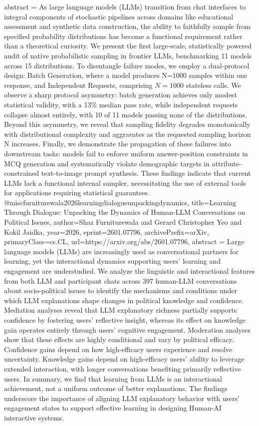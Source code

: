 {      abstract = {As large language models (LLMs) transition from chat interfaces to integral components of stochastic pipelines across domains like educational assessment and synthetic data construction, the ability to faithfully sample from specified probability distributions has become a functional requirement rather than a theoretical curiosity. We present the first large-scale, statistically powered audit of native probabilistic sampling in frontier LLMs, benchmarking 11 models across 15 distributions. To disentangle failure modes, we employ a dual-protocol design: Batch Generation, where a model produces N=1000 samples within one response, and Independent Requests, comprising $N=1000$ stateless calls. We observe a sharp protocol asymmetry: batch generation achieves only modest statistical validity, with a 13\% median pass rate, while independent requests collapse almost entirely, with 10 of 11 models passing none of the distributions. Beyond this asymmetry, we reveal that sampling fidelity degrades monotonically with distributional complexity and aggravates as the requested sampling horizon N increases. Finally, we demonstrate the propagation of these failures into downstream tasks: models fail to enforce uniform answer-position constraints in MCQ generation and systematically violate demographic targets in attribute-constrained text-to-image prompt synthesis. These findings indicate that current LLMs lack a functional internal sampler, necessitating the use of external tools for applications requiring statistical guarantees.}
}@misc{furniturewala2026learningdialogueunpackingdynamics,
      title={Learning Through Dialogue: Unpacking the Dynamics of Human-LLM Conversations on Political Issues}, 
      author={Shaz Furniturewala and Gerard Christopher Yeo and Kokil Jaidka},
      year={2026},
      eprint={2601.07796},
      archivePrefix={arXiv},
      primaryClass={cs.CL},
      url={https://arxiv.org/abs/2601.07796},
      abstract = {Large language models (LLMs) are increasingly used as conversational partners for learning, yet the interactional dynamics supporting users' learning and engagement are understudied. We analyze the linguistic and interactional features from both LLM and participant chats across 397 human-LLM conversations about socio-political issues to identify the mechanisms and conditions under which LLM explanations shape changes in political knowledge and confidence. Mediation analyses reveal that LLM explanatory richness partially supports confidence by fostering users' reflective insight, whereas its effect on knowledge gain operates entirely through users' cognitive engagement. Moderation analyses show that these effects are highly conditional and vary by political efficacy. Confidence gains depend on how high-efficacy users experience and resolve uncertainty. Knowledge gains depend on high-efficacy users' ability to leverage extended interaction, with longer conversations benefiting primarily reflective users. In summary, we find that learning from LLMs is an interactional achievement, not a uniform outcome of better explanations. The findings underscore the importance of aligning LLM explanatory behavior with users' engagement states to support effective learning in designing Human-AI interactive systems.}
}

